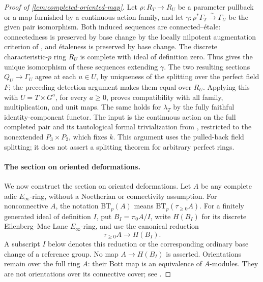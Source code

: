 \begin{proof}[Proof of \cref{lem:completed-oriented-map}]
Let \(\rho:R_T\to R_U\) be a parameter pullback or a map furnished by a
continuous action family, and let
\(\gamma:\rho^*\Gamma_T\xrightarrow{\sim}\Gamma_U\) be the given pair
isomorphism. Both induced sequences are connected--étale: connectedness
is preserved by base change by the locally nilpotent augmentation
criterion of \cite[Remark~2.3.8]{LurieEllipticII2018}, and étaleness is
preserved by base change. The discrete characteristic-\(p\) ring \(R_U\)
is complete with ideal of definition zero. Thus
\cite[Theorem~2.5.13]{LurieEllipticII2018} gives the unique isomorphism of
these sequences extending \(\gamma\). The two resulting sections
\(Q_U\to\Gamma_U\) agree at each \(u\in U\), by uniqueness of the splitting
over the perfect field \(F\); the preceding detection argument makes them
equal over \(R_U\). Applying this with \(U=T\times G^a\), for every
\(a\geq0\), proves compatibility with all family, multiplication, and unit
maps. The same holds for \(\lambda_T\) by the fully faithful
identity-component functor. The input is the continuous action on the
full completed pair and its tautological formal trivialization from
\cite[Examples~4.6.3--4.6.4]{BMR2026}, restricted to the nonextended
\(P_3\times P_2\), which fixes \(k\). This argument uses the pulled-back
field splitting; it does not assert a splitting theorem for arbitrary
perfect rings.

\paragraph{The section on oriented deformations.}
We now construct the section on oriented deformations. Let \(A\) be any
complete adic \(E_\infty\)-ring, without a Noetherian or connectivity
assumption. For nonconnective \(A\), the notation \(\mathrm{BT}_p(A)\)
means \(\mathrm{BT}_p(\tau_{\geq0}A)\). For a finitely generated ideal of
definition \(I\), put \(B_I=\pi_0A/I\), write \(H(B_I)\) for its discrete
Eilenberg--Mac Lane \(E_\infty\)-ring, and use the canonical reduction
\[
 \tau_{\geq0}A\longrightarrow H(B_I).
\]
A subscript \(I\) below denotes this reduction or the corresponding
ordinary base change of a reference group. No map \(A\to H(B_I)\) is
asserted. Orientations remain over
the full ring \(A\): their Bott map is an equivalence of \(A\)-modules.
They are not orientations over its connective cover; see
\cite[Warning~4.3.12]{LurieEllipticII2018}.


\end{proof}
